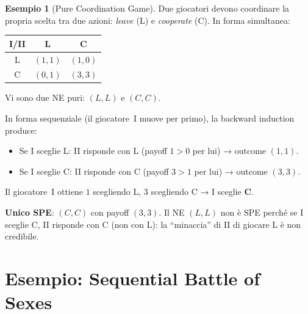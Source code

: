 \documentclass[12pt,a4paper,twoside]{book}
\theoremstyle{plain}
\theoremstyle{definition}
\newtheorem{example}[theorem]{Esempio}
\begin{document}
\begin{example}[Pure Coordination Game]
Due giocatori devono coordinare la propria scelta tra due azioni: \emph{leave} (L) e \emph{cooperate} (C). In forma simultanea:
\begin{center}
\begin{tabular}{c|cc}
I/II & L & C \\\hline
L & $(1,1)$ & $(1,0)$ \\
C & $(0,1)$ & $(3,3)$
\end{tabular}
\end{center}
Vi sono due NE puri: $(L,L)$ e $(C,C)$.

In forma sequenziale (il giocatore~I muove per primo), la backward induction produce:
\begin{itemize}
  \item Se I sceglie L: II risponde con L (payoff $1>0$ per lui) → outcome $(1,1)$.
  \item Se I sceglie C: II risponde con C (payoff $3>1$ per lui) → outcome $(3,3)$.
\end{itemize}
Il giocatore~I ottiene $1$ scegliendo L, $3$ scegliendo C → I sceglie \textbf{C}.

\textbf{Unico SPE}: $(C, C)$ con payoff $(3,3)$. Il NE $(L,L)$ non è SPE perché se I sceglie C, II risponde con C (non con L): la ``minaccia'' di II di giocare L è non credibile.
\end{example}

\section{Esempio: Sequential Battle of Sexes}
\end{document}
